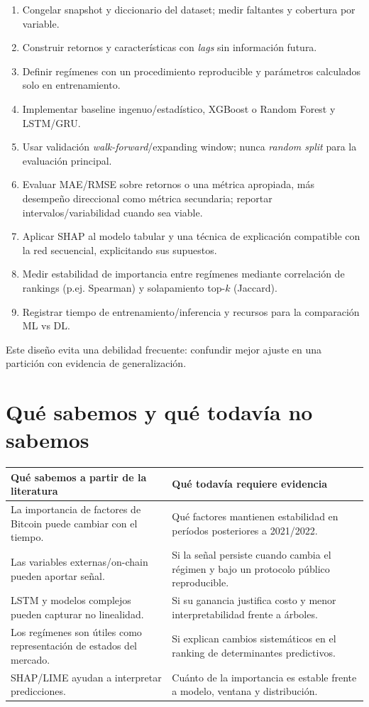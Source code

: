 \documentclass[11pt,letterpaper]{article}
\begin{document}
\begin{enumerate}
  \item Congelar snapshot y diccionario del dataset; medir faltantes y cobertura por variable.
  \item Construir retornos y características con \emph{lags} sin información futura.
  \item Definir regímenes con un procedimiento reproducible y parámetros calculados solo en entrenamiento.
  \item Implementar baseline ingenuo/estadístico, XGBoost o Random Forest y LSTM/GRU.
  \item Usar validación \emph{walk-forward}/expanding window; nunca \emph{random split} para la evaluación principal.
  \item Evaluar MAE/RMSE sobre retornos o una métrica apropiada, más desempeño direccional como métrica secundaria; reportar intervalos/variabilidad cuando sea viable.
  \item Aplicar SHAP al modelo tabular y una técnica de explicación compatible con la red secuencial, explicitando sus supuestos.
  \item Medir estabilidad de importancia entre regímenes mediante correlación de rankings (p.ej. Spearman) y solapamiento top-$k$ (Jaccard).
  \item Registrar tiempo de entrenamiento/inferencia y recursos para la comparación ML vs DL.
\end{enumerate}

Este diseño evita una debilidad frecuente: confundir mejor ajuste en una partición con evidencia de generalización.

\section{Qué sabemos y qué todavía no sabemos}

\begin{table}[ht]
\centering
\small
\begin{tabularx}{\textwidth}{X X}
\toprule
\textbf{Qué sabemos a partir de la literatura} & \textbf{Qué todavía requiere evidencia} \\
\midrule
La importancia de factores de Bitcoin puede cambiar con el tiempo. & Qué factores mantienen estabilidad en períodos posteriores a 2021/2022. \\
Las variables externas/on-chain pueden aportar señal. & Si la señal persiste cuando cambia el régimen y bajo un protocolo público reproducible. \\
LSTM y modelos complejos pueden capturar no linealidad. & Si su ganancia justifica costo y menor interpretabilidad frente a árboles. \\
Los regímenes son útiles como representación de estados del mercado. & Si explican cambios sistemáticos en el ranking de determinantes predictivos. \\
SHAP/LIME ayudan a interpretar predicciones. & Cuánto de la importancia es estable frente a modelo, ventana y distribución. \\
\bottomrule
\end{tabularx}
\end{table}
\end{document}
